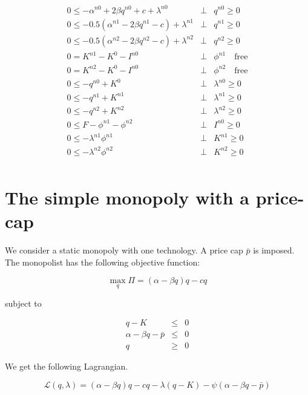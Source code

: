 \documentclass[11pt,a4paper]{article}
\begin{document}
\begin{eqnarray*}
	0 \leq -\alpha^{n0} + 2\beta q^{n0} + c + \lambda^{n0} &\bot& q^{n0} \geq 0\\
        0 \leq -0.5\left(\alpha^{n1} - 2\beta q^{n1} - c\right) + \lambda^{n1} &\bot& q^{n1} \geq 0\\
        0 \leq -0.5\left(\alpha^{n2} - 2\beta q^{n2} - c\right) + \lambda^{n2} &\bot& q^{n2} \geq 0\\
        0 = K^{n1}-K^0-I^{n0}  &\bot& \phi^{n1} \quad\mbox{free}\\
        0 = K^{n2}-K^0-I^{n0}  &\bot& \phi^{n2} \quad\mbox{free}\\
	0 \leq -q^{n0} + K^{0} &\bot& \lambda^{n0} \geq 0\\
	0 \leq -q^{n1} + K^{n1} &\bot& \lambda^{n1} \geq 0\\
	0 \leq -q^{n2} + K^{n2} &\bot& \lambda^{n2} \geq 0\\
	0 \leq F-\phi^{n1}-\phi^{n2} &\bot& I^{n0} \geq 0\\
	0 \leq -\lambda^{n1}\phi^{n1} &\bot& K^{n1} \geq 0\\
        0 \leq -\lambda^{n2}\phi^{n2}  &\bot& K^{n2} \geq 0\\
\end{eqnarray*}


\section{The simple monopoly with a price-cap}

We consider a static monopoly with one technology. A price cap $\bar{p}$ is imposed. The monopolist has the following objective function:

\begin{equation*}
	\max_q\Pi = (\alpha-\beta q)q - cq 
\end{equation*}

subject to

\begin{eqnarray*}
	q - K &\leq& 0\\
        \alpha-\beta q - \bar{p} &\leq& 0 \\ 
	q &\geq& 0 
\end{eqnarray*}
 
We get the following Lagrangian.

\begin{equation*}
	\mathcal{L}(q,\lambda)= (\alpha-\beta q)q - cq -\lambda(q-K) - \psi\left(\alpha-\beta q-\bar{p}\right)
\end{equation*}
\end{document}
